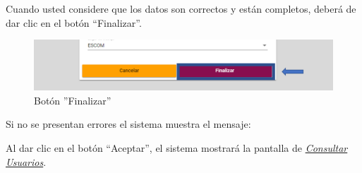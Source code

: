                 Cuando usted considere que los datos son correctos y están completos, deberá de dar clic en el botón “Finalizar”.
                \begin{figure}[!hbtp]
                    \centering
                    \hypertarget{btnfin}{\includegraphics[width=0.7\linewidth]{images/SP5/BtnFinalizar}}
                    \caption{Botón ''Finalizar''}
                    \label{btnfin}
                \end{figure}
                
                Si no se presentan errores el sistema muestra el mensaje:
                
                Al dar clic en el botón “Aceptar”, el sistema mostrará la pantalla de \hyperlink{consultarUs}{\textit{Consultar Usuarios}}.
                
